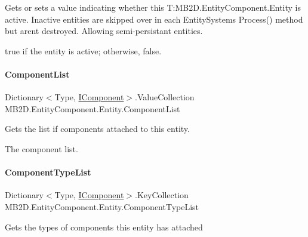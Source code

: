 Gets or sets a value indicating whether this T\+:\+M\+B2\+D.\+Entity\+Component.\+Entity is active. Inactive entities are skipped over in each Entity\+Systems Process() method but aren\textquotesingle{}t destroyed. Allowing semi-\/persistant entities. 

{\ttfamily true} if the entity is active; otherwise, {\ttfamily false}.\hypertarget{class_m_b2_d_1_1_entity_component_1_1_entity_ae15b38df98affb3a58dc53c4a1140f3e}{}\label{class_m_b2_d_1_1_entity_component_1_1_entity_ae15b38df98affb3a58dc53c4a1140f3e} 
\paragraph{\texorpdfstring{Component\+List}{ComponentList}}
{\footnotesize\ttfamily Dictionary$<$Type, \hyperlink{interface_m_b2_d_1_1_entity_component_1_1_i_component}{I\+Component}$>$.Value\+Collection M\+B2\+D.\+Entity\+Component.\+Entity.\+Component\+List\hspace{0.3cm}{\ttfamily [get]}}



Gets the list if components attached to this entity. 

The component list.\hypertarget{class_m_b2_d_1_1_entity_component_1_1_entity_abd8ccf1511e8c825ee2574b3bc7af158}{}\label{class_m_b2_d_1_1_entity_component_1_1_entity_abd8ccf1511e8c825ee2574b3bc7af158} 
\paragraph{\texorpdfstring{Component\+Type\+List}{ComponentTypeList}}
{\footnotesize\ttfamily Dictionary$<$Type, \hyperlink{interface_m_b2_d_1_1_entity_component_1_1_i_component}{I\+Component}$>$.Key\+Collection M\+B2\+D.\+Entity\+Component.\+Entity.\+Component\+Type\+List\hspace{0.3cm}{\ttfamily [get]}}



Gets the types of components this entity has attached 

